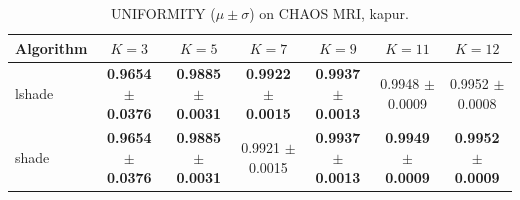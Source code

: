 \begin{table}[htbp]
\centering
\caption{UNIFORMITY ($\mu \pm \sigma$) on CHAOS MRI, kapur.}
\label{tab:exp2-kapur-uniformity}
\begin{tabular}{lcccccc}
\toprule
Algorithm & $K=3$ & $K=5$ & $K=7$ & $K=9$ & $K=11$ & $K=12$ \\
\midrule
lshade & \textbf{0.9654 $\pm$ 0.0376} & \textbf{0.9885 $\pm$ 0.0031} & \textbf{0.9922 $\pm$ 0.0015} & \textbf{0.9937 $\pm$ 0.0013} & 0.9948 $\pm$ 0.0009 & 0.9952 $\pm$ 0.0008 \\
shade & \textbf{0.9654 $\pm$ 0.0376} & \textbf{0.9885 $\pm$ 0.0031} & 0.9921 $\pm$ 0.0015 & \textbf{0.9937 $\pm$ 0.0013} & \textbf{0.9949 $\pm$ 0.0009} & \textbf{0.9952 $\pm$ 0.0009} \\
\bottomrule
\end{tabular}
\end{table}